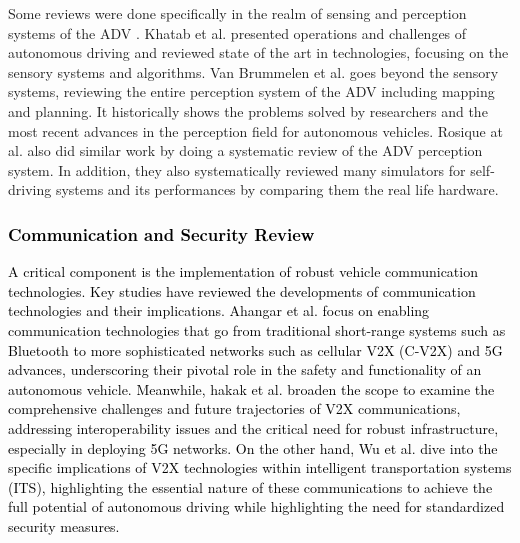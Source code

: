 \documentclass[lettersize,journal]{IEEEtran}
\begin{document}
\leavevmode\vspace{0.1\baselineskip}%

Some reviews were done specifically in the realm of sensing and perception systems of the ADV \cite{KHATAB202136,van2018,rosique2019}.
Khatab et al. \cite{KHATAB202136} presented operations and challenges of autonomous driving and reviewed state of the art in technologies, focusing on the sensory systems and algorithms. Van Brummelen et al. \cite{van2018} goes beyond the sensory systems, reviewing the entire perception system of the ADV including mapping and planning. It historically shows the problems solved by researchers and the most recent advances in the perception field for autonomous vehicles. Rosique at al. \cite{rosique2019} also did similar work by doing a systematic review of the ADV perception system. In addition, they also systematically reviewed many simulators for self-driving systems and its performances by comparing them the real life hardware.

\vspace{1em}

\subsubsection {\textcolor{black}{\textbf{Communication and Security Review}}}

\leavevmode\vspace{0.1\baselineskip}%

 \textcolor{black}{A critical component is the implementation of robust vehicle communication technologies. Key studies have reviewed the developments of communication technologies and their implications. Ahangar et al. \cite{ahangar2021} focus on enabling communication technologies that go from traditional short-range systems such as Bluetooth to more sophisticated networks such as cellular V2X (C-V2X) and 5G advances, underscoring their pivotal role in the safety and functionality of an autonomous vehicle. Meanwhile, hakak et al. \cite{hakak2023} broaden the scope to examine the comprehensive challenges and future trajectories of V2X communications, addressing interoperability issues and the critical need for robust infrastructure, especially in deploying 5G networks. On the other hand, Wu et al. \cite{wu2023} dive into the specific implications of V2X technologies within intelligent transportation systems (ITS), highlighting the essential nature of these communications to achieve the full potential of autonomous driving while highlighting the need for standardized security measures.}
 
\end{document}
